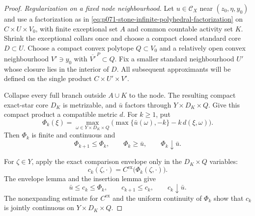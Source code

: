 \begin{proof}
\medskip\noindent
\emph{Regularization on a fixed node neighbourhood.}
Let $u\in\mathcal C_X$ near $(z_0,\eta,y_0)$ and use a factorization as in
\eqref{eq:p071-stone-infinite-polyhedral-factorization} on
$C\times U\times V_0$, with finite exceptional set $A$ and common
countable activity set $K$.  Shrink the exceptional collars once and choose
a compact closed standard core $D\subset U$.  Choose a compact convex
polytope $Q\subset V_0$ and a relatively open convex neighbourhood
$V'\ni y_0$ with $\overline{V'}^{\,P}\subset Q$.  Fix a smaller standard
neighbourhood $U'$ whose closure lies in the interior of $D$.  All
subsequent approximants will be defined on the single product
$C\times U'\times V'$.

Collapse every full branch outside $A\cup K$ to the node.  The resulting
compact exact-star core $D_K$ is metrizable, and $\bar u$ factors through
$Y\times D_K\times Q$.  Give this compact product a compatible metric
$d$.  For $k\geq1$, put
\begin{equation}
 \Phi_k(\xi)=\max_{\omega\in Y\times D_K\times Q}
       \bigl(\max\{\bar u(\omega),-k\}-k\,d(\xi,\omega)\bigr).
 \label{eq:p071-stone-infinite-polyhedral-upper-regularization}
\end{equation}
Then $\Phi_k$ is finite and continuous and
\begin{equation}
          \Phi_{k+1}\leq\Phi_k,
   \qquad \Phi_k\geq\bar u,
   \qquad \Phi_k\downarrow\bar u.
 \label{eq:p071-stone-infinite-polyhedral-upper-limit}
\end{equation}

For $\zeta\in Y$, apply the exact comparison envelope only in the
$D_K\times Q$ variables:
\begin{equation}
 c_k(\zeta,\cdot)
    =C^{\mathrm{ex}}\bigl(\Phi_k(\zeta,\cdot)\bigr).
 \label{eq:p071-stone-infinite-polyhedral-fibre-envelope}
\end{equation}
The envelope lemma and the insertion lemma give
\begin{equation}
 \bar u\leq c_k\leq\Phi_k,
 \qquad c_{k+1}\leq c_k,
 \qquad c_k\downarrow\bar u.
 \label{eq:p071-stone-infinite-polyhedral-envelope-limit}
\end{equation}
The nonexpanding estimate for $C^{\mathrm{ex}}$ and the uniform continuity
of $\Phi_k$ show that $c_k$ is jointly continuous on
$Y\times D_K\times Q$.


\end{proof}
